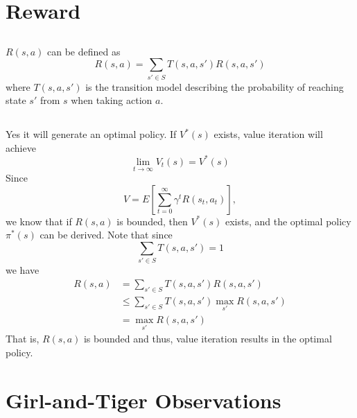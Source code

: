 

\usepackage{tikz}
\usetikzlibrary{positioning}





\section{Reward}

\subsection{}
$R(s,a)$ can be defined as
\[R(s,a) = \sum_{s'\in S}T(s,a,s')R(s,a,s')\]
where $T(s,a,s')$ is the transition model describing the probability
of reaching state $s'$ from $s$ when taking action $a$.

\subsection{}
Yes it will generate an optimal policy.
If $V^*(s)$ exists, value iteration will achieve \cite{sutton20}
\[\lim_{t\rightarrow \infty} V_t(s)=V^*(s)\]
Since 
\[V=E\left[\sum_{t=0}^\infty \gamma^t R(s_t, a_t)\right],\]
we know that if $R(s,a)$ is bounded, then $V^*(s)$ exists,
and the optimal policy $\pi^*(s)$ can be derived.
Note that since
\[\sum_{s'\in S}T(s,a,s')=1\]
we have
\begin{equation}
\begin{aligned}
    R(s,a) &= \sum_{s'\in S}T(s,a,s')R(s,a,s')\\
    &\leq \sum_{s'\in S}T(s,a,s')\max_{s'}R(s,a,s')\\
    &=\max_{s'}R(s,a,s')
\end{aligned}
\end{equation}
That is, $R(s,a)$ is bounded and thus, 
value iteration results in the optimal policy.

\newpage
\section{Girl-and-Tiger Observations}

